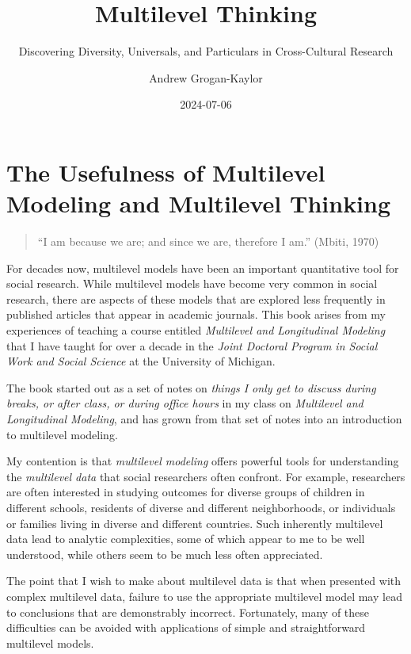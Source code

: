 \documentclass[
  letterpaper,
  DIV=11,
  numbers=noendperiod]{scrreprt}
\title{Multilevel Thinking}
\subtitle{Discovering Diversity, Universals, and Particulars in
Cross-Cultural Research}
\author{Andrew Grogan-Kaylor}
\date{2024-07-06}
\renewcommand*\contentsname{Table of contents}
\newcommand\contentsname{Table of contents}
\begin{document}
\maketitle

\renewcommand*\contentsname{Table of contents}
{
\hypersetup{linkcolor=}
\setcounter{tocdepth}{2}
\tableofcontents
}
\listoffigures
\listoftables
{}

\chapter{The Usefulness of Multilevel Modeling and Multilevel
Thinking}\label{sec-multilevel-thinking}

\begin{quote}
``I am because we are; and since we are, therefore I am.'' (Mbiti, 1970)
\end{quote}

For decades now, multilevel models have been an important quantitative
tool for social research. While multilevel models have become very
common in social research, there are aspects of these models that are
explored less frequently in published articles that appear in academic
journals. This book arises from my experiences of teaching a course
entitled \emph{Multilevel and Longitudinal Modeling} that I have taught
for over a decade in the \emph{Joint Doctoral Program in Social Work and
Social Science} at the University of Michigan.

The book started out as a set of notes on \emph{things I only get to
discuss during breaks, or after class, or during office hours} in my
class on \emph{Multilevel and Longitudinal Modeling}, and has grown from
that set of notes into an introduction to multilevel modeling.

My contention is that \emph{multilevel modeling} offers powerful tools
for understanding the \emph{multilevel data} that social researchers
often confront. For example, researchers are often interested in
studying outcomes for diverse groups of children in different schools,
residents of diverse and different neighborhoods, or individuals or
families living in diverse and different countries. Such inherently
multilevel data lead to analytic complexities, some of which appear to
me to be well understood, while others seem to be much less often
appreciated.

The point that I wish to make about multilevel data is that when
presented with complex multilevel data, failure to use the appropriate
multilevel model may lead to conclusions that are demonstrably
incorrect. Fortunately, many of these difficulties can be avoided with
applications of simple and straightforward multilevel models.
\end{document}
